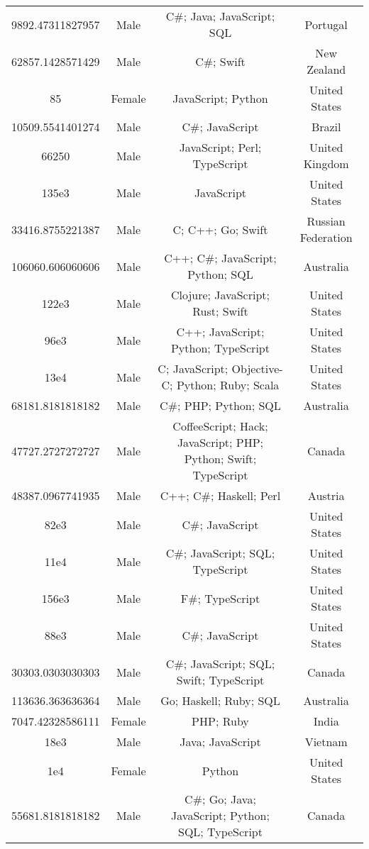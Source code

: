 \begin{center}
\begin{tabular}{ |c|c|c|c| }
9892.47311827957  &  Male  &  C\#; Java; JavaScript; SQL  &  Portugal  \\ 
62857.1428571429  &  Male  &  C\#; Swift  &  New Zealand  \\ 
85  &  Female  &  JavaScript; Python  &  United States  \\ 
10509.5541401274  &  Male  &  C\#; JavaScript  &  Brazil  \\ 
66250  &  Male  &  JavaScript; Perl; TypeScript  &  United Kingdom  \\ 
135e3  &  Male  &  JavaScript  &  United States  \\ 
33416.8755221387  &  Male  &  C; C++; Go; Swift  &  Russian Federation  \\ 
106060.606060606  &  Male  &  C++; C\#; JavaScript; Python; SQL  &  Australia  \\ 
122e3  &  Male  &  Clojure; JavaScript; Rust; Swift  &  United States  \\ 
96e3  &  Male  &  C++; JavaScript; Python; TypeScript  &  United States  \\ 
13e4  &  Male  &  C; JavaScript; Objective-C; Python; Ruby; Scala  &  United States  \\ 
68181.8181818182  &  Male  &  C\#; PHP; Python; SQL  &  Australia  \\ 
47727.2727272727  &  Male  &  CoffeeScript; Hack; JavaScript; PHP; Python; Swift; TypeScript  &  Canada  \\ 
48387.0967741935  &  Male  &  C++; C\#; Haskell; Perl  &  Austria  \\ 
82e3  &  Male  &  C\#; JavaScript  &  United States  \\ 
11e4  &  Male  &  C\#; JavaScript; SQL; TypeScript  &  United States  \\ 
156e3  &  Male  &  F\#; TypeScript  &  United States  \\ 
88e3  &  Male  &  C\#; JavaScript  &  United States  \\ 
30303.0303030303  &  Male  &  C\#; JavaScript; SQL; Swift; TypeScript  &  Canada  \\ 
113636.363636364  &  Male  &  Go; Haskell; Ruby; SQL  &  Australia  \\ 
7047.42328586111  &  Female  &  PHP; Ruby  &  India  \\ 
18e3  &  Male  &  Java; JavaScript  &  Vietnam  \\ 
1e4  &  Female  &  Python  &  United States  \\ 
55681.8181818182  &  Male  &  C\#; Go; Java; JavaScript; Python; SQL; TypeScript  &  Canada  \\ 

\end{tabular}
\end{center}

